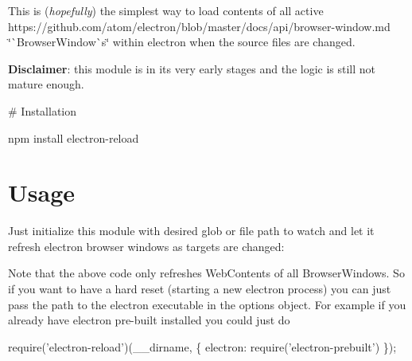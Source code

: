 This is ({\itshape hopefully}) the simplest way to load contents of all active https\+://github.com/atom/electron/blob/master/docs/api/browser-\/window.\+md \char`\"{}\`{}\+Browser\+Window\`{}s\char`\"{} within electron when the source files are changed.

\href{https://travis-ci.org/yan-foto/electron-reload}{\tt } \href{https://github.com/yan-foto/neutron}{\tt } \href{https://www.npmjs.com/package/electron-reload}{\tt } \href{https://codeclimate.com/github/yan-foto/electron-reload}{\tt } \href{https://snyk.io/test/github/yan-foto/electron-reload}{\tt } 

{\bfseries Disclaimer}\+: this module is in its very early stages and the logic is still not mature enough.

\# Installation 
\begin{DoxyCode}
npm install electron-reload
\end{DoxyCode}


\section*{Usage}

Just initialize this module with desired glob or file path to watch and let it refresh electron browser windows as targets are changed\+:




Note that the above code only refreshes {\ttfamily Web\+Content}s of all {\ttfamily Browser\+Window}s. So if you want to have a hard reset (starting a new electron process) you can just pass the path to the electron executable in the {\ttfamily options} object. For example if you already have electron pre-\/built installed you could just do


\begin{DoxyCode}
require('electron-reload')(\_\_dirname, \{
  electron: require('electron-prebuilt')
\});
\end{DoxyCode}


